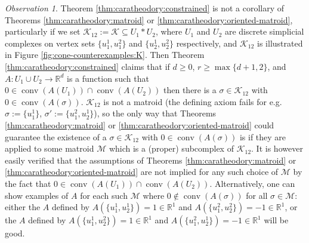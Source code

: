 \documentclass[a4paper,11pt,reqno, english]{amsart}
\theoremstyle{definition}
\theoremstyle{remark}
\newtheorem{observation}[theorem]{Observation}
\newcommand\R{\mathbb R}
\DeclareMathOperator{\conv}{\mathrm{conv}}
\begin{document}
\begin{observation}\label{obs:constrained-caratheodory-new}
    Theorem \ref{thm:caratheodory:constrained} is not a corollary of Theorems \ref{thm:caratheodory:matroid} or \ref{thm:caratheodory:oriented-matroid}, particularly if we set $\mathscr{K}_{12}:=\mathscr{K}\subseteq U_1*U_2$, where $U_1$ and $U_2$ are discrete simplicial complexes on vertex sets $\{u_1^1,u_1^2\}$ and $\{u_2^1,u_2^2\}$ respectively, and $\mathscr{K}_{12}$ is illustrated in Figure \ref{fig:cone-counterexamples:K}. Then Theorem \ref{thm:caratheodory:constrained} claims that if $d\geq 0$, $r\geq\max\{d+1,2\}$, and $A\colon {U_1\cup U_2}\to\R^d$ is a function such that $0\in\conv(A(U_1))\cap\conv(A(U_2))$ then there is a $\sigma\in\mathscr{K}_{12}$ with $0\in\conv(A(\sigma))$. $\mathscr{K}_{12}$ is not a matroid (the defining axiom fails for e.g. $\sigma:=\{u_1^1\}$, $\sigma':=\{u_1^2,u_2^1\}$), so the only way that Theorems \ref{thm:caratheodory:matroid} or \ref{thm:caratheodory:oriented-matroid} could guarantee the existence of a $\sigma\in\mathscr{K}_{12}$ with $0\in\conv(A(\sigma))$ is if they are applied to some matroid $\mathscr{M}$ which is a (proper) subcomplex of $\mathscr{K}_{12}$. It is however easily verified that the assumptions of Theorems \ref{thm:caratheodory:matroid} or \ref{thm:caratheodory:oriented-matroid} are not implied for any such choice of $\mathscr{M}$ by the fact that $0\in\conv(A(U_1))\cap\conv(A(U_2))$. Alternatively, one can show examples of $A$ for each such $\mathscr{M}$ where $0\notin\conv(A(\sigma))$ for all $\sigma\in\mathscr{M}$: either the $A$ defined by $A(\{u_1^1,u_2^1\})=1\in\R^1$ and $A(\{u_1^2,u_2^2\})=-1\in\R^1$, or the $A$ defined by $A(\{u_1^1,u_2^2\})=1\in\R^1$ and $A(\{u_1^2,u_2^1\})=-1\in\R^1$ will be good.
\end{observation}
\end{document}
